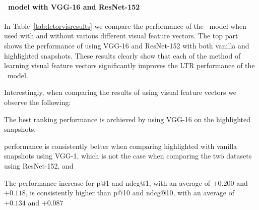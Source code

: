 
\paragraph{\modelname~model with VGG-16 and ResNet-152}
In Table~\ref{tab:letorvisresults} we compare the performance of the \modelname~model when used with and without various different visual feature vectors. The top part shows the performance of using VGG-16 and ResNet-152 with both vanilla and highlighted snapshots. 
These results clearly show that each of the method of learning visual feature vectors significantly improves the \ac{LTR} performance of the \modelname~model. 

Interestingly, when comparing the results of using visual feature vectors we observe the following:
\begin{inparaenum}[(i)]
\item The best ranking performance is archieved by using VGG-16 on the highlighted snapshots, 
\item performance is consistently better when comparing highlighted with vanilla snapshots using VGG-1, which is not the case when comparing the two datasets using ResNet-152, and 
\item The performance increase for p@1 and ndcg@1, with an average of $+0.200$ and $+0.118$, is consistently higher than p@10 and ndcg@10, with an average of $+0.134$ and $+0.087$
\end{inparaenum}

